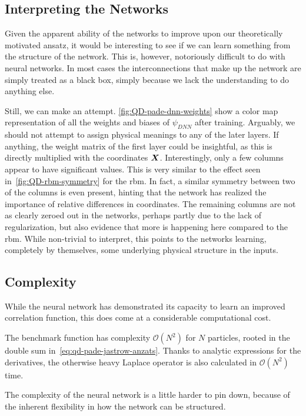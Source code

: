 \documentclass[Thesis.tex]{subfiles}
\begin{document}
\subsection{Interpreting the Networks}

Given the apparent ability of the networks to improve upon our theoretically
motivated ansatz, it would be interesting to see if we can learn something from
the structure of the network. This is, however, notoriously difficult to do with
neural networks. In most cases the interconnections that make up the network are
simply treated as a black box, simply because we lack the understanding to do
anything else.

Still, we can make an attempt. \cref{fig:QD-pade-dnn-weights} show a color map
representation of all the weights and biases of $\psi_{DNN}$ after training.
Arguably, we should not attempt to assign physical meanings to any of the later
layers. If anything, the weight matrix of the first layer could be insightful,
as this is directly multiplied with the coordinates $\bm{X}$. Interestingly,
only a few columns appear to have significant values. This is very similar to the
effect seen in~\cref{fig:QD-rbm-symmetry} for the \gls{rbm}. In fact, a similar
symmetry between two of the columns is even present, hinting that the network
has realized the importance of relative differences in coordinates. The
remaining columns are not as clearly zeroed out in the networks, perhaps partly due to
the lack of regularization, but also evidence that more is happening here
compared to the \gls{rbm}. While non-trivial to interpret, this points to the
networks learning, completely by themselves, some underlying physical structure
in the inputs.



\subsection{Complexity}

While the neural network has demonstrated its capacity to learn an improved
correlation function, this does come at a considerable computational cost.

The benchmark function has complexity $\mathcal{O}(N^2)$ for $N$ particles,
rooted in the double sum in~\cref{eq:qd-pade-jastrow-anzats}. Thanks to
analytic expressions for the derivatives, the otherwise heavy Laplace operator
is also calculated in $\mathcal{O}(N^2)$ time.

The complexity of the neural network is a little harder to pin down, because of
the inherent flexibility in how the network can be structured.
\end{document}

